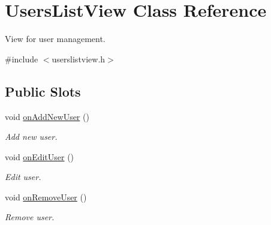 \hypertarget{class_users_list_view}{\section{\-Users\-List\-View \-Class \-Reference}
\label{class_users_list_view}
}


\-View for user management.  




{\ttfamily \#include $<$userslistview.\-h$>$}

\subsection*{\-Public \-Slots}
\begin{DoxyCompactItemize}
\item 
void \hyperlink{class_users_list_view_a79959999ef3888941bb81307ecd68aea}{on\-Add\-New\-User} ()
\begin{DoxyCompactList}\small\item\em \-Add new user. \end{DoxyCompactList}\item 
void \hyperlink{class_users_list_view_abaebcd202fd977b4c52fae1cb561fecf}{on\-Edit\-User} ()
\begin{DoxyCompactList}\small\item\em \-Edit user. \end{DoxyCompactList}\item 
void \hyperlink{class_users_list_view_aea4176cc754f9e062eae4e41b8c3761d}{on\-Remove\-User} ()
\begin{DoxyCompactList}\small\item\em \-Remove user. \end{DoxyCompactList}\end{DoxyCompactItemize}
